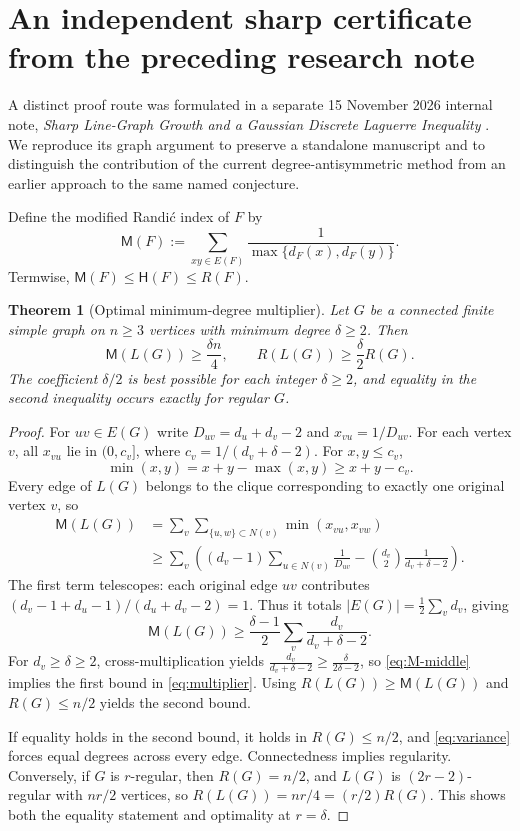 \documentclass[11pt,a4paper]{article}
\newtheorem{theorem}{Theorem}[section]
\theoremstyle{remark}
\newcommand{\MM}{\mathsf M}
\newcommand{\HH}{\mathsf H}
\begin{document}
\section{An independent sharp certificate from the preceding research note}
A distinct proof route was formulated in a separate 15 November 2026 internal note, \emph{Sharp Line-Graph Growth and a Gaussian Discrete Laguerre Inequality} \cite{Earlier}. We reproduce its graph argument to preserve a standalone manuscript and to distinguish the contribution of the current degree-antisymmetric method from an earlier approach to the same named conjecture.

Define the modified Randi\'c index of $F$ by
\begin{equation}\label{eq:M}
 \MM(F):=\sum_{xy\in E(F)}\frac1{\max\{d_F(x),d_F(y)\}}.
\end{equation}
Termwise, $\MM(F)\le\HH(F)\le R(F)$.
\begin{theorem}[Optimal minimum-degree multiplier]\label{thm:multiplier}
Let $G$ be a connected finite simple graph on $n\ge3$ vertices with minimum degree $\delta\ge2$. Then
\begin{equation}\label{eq:multiplier}
 \MM(L(G))\ge\frac{\delta n}{4},\qquad
 R(L(G))\ge\frac{\delta}{2}R(G).
\end{equation}
The coefficient $\delta/2$ is best possible for each integer $\delta\ge2$, and equality in the second inequality occurs exactly for regular $G$.
\end{theorem}
\begin{proof}
For $uv\in E(G)$ write $D_{uv}=d_u+d_v-2$ and $x_{vu}=1/D_{uv}$. For each vertex $v$, all $x_{vu}$ lie in $(0,c_v]$, where $c_v=1/(d_v+\delta-2)$. For $x,y\le c_v$,
\[
 \min(x,y)=x+y-\max(x,y)\ge x+y-c_v.
\]
Every edge of $L(G)$ belongs to the clique corresponding to exactly one original vertex $v$, so
\begin{align*}
 \MM(L(G))
 &=\sum_v\sum_{\{u,w\}\subset N(v)}\min(x_{vu},x_{vw})\\
 &\ge\sum_v\left((d_v-1)\sum_{u\in N(v)}\frac1{D_{uv}}
 -\binom{d_v}{2}\frac1{d_v+\delta-2}\right).
\end{align*}
The first term telescopes: each original edge $uv$ contributes $(d_v-1+d_u-1)/(d_u+d_v-2)=1$. Thus it totals $|E(G)|=\frac12\sum_vd_v$, giving
\begin{equation}\label{eq:M-middle}
 \MM(L(G))\ge\frac{\delta-1}{2}\sum_v\frac{d_v}{d_v+\delta-2}.
\end{equation}
For $d_v\ge\delta\ge2$, cross-multiplication yields
$\frac{d_v}{d_v+\delta-2}\ge\frac{\delta}{2\delta-2}$, so \eqref{eq:M-middle} implies the first bound in \eqref{eq:multiplier}. Using $R(L(G))\ge\MM(L(G))$ and $R(G)\le n/2$ yields the second bound.

If equality holds in the second bound, it holds in $R(G)\le n/2$, and \eqref{eq:variance} forces equal degrees across every edge. Connectedness implies regularity. Conversely, if $G$ is $r$-regular, then $R(G)=n/2$, and $L(G)$ is $(2r-2)$-regular with $nr/2$ vertices, so $R(L(G))=nr/4=(r/2)R(G)$. This shows both the equality statement and optimality at $r=\delta$.
\end{proof}
\end{document}
